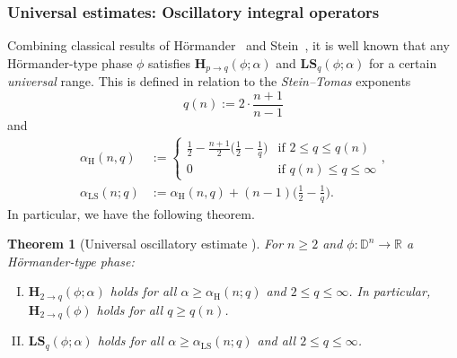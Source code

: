 \documentclass[reqno]{amsart}
\numberwithin{equation}{section}
\newcommand{\D}{\mathbb{D}}
\newcommand{\R}{\mathbb{R}}
\newcommand{\bH}{\mathbf{H}}
\newcommand{\bLS}{\mathbf{LS}}
\theoremstyle{plain}
\newtheorem{theorem}{Theorem}[section]
\theoremstyle{definition}
\begin{document}



\subsubsection*{Universal estimates: Oscillatory integral operators}%

Combining classical results of H\"ormander~\cite{Hormander1973} and Stein~\cite{Stein1986}, it is well known that any H\"ormander-type phase $\phi$ satisfies $\bH_{p \to q}(\phi;\alpha)$ and $\bLS_q(\phi; \alpha)$ for a certain \textit{universal} range. This is defined in relation to the \textit{Stein--Tomas} exponents
\begin{equation*}
  q(n) :=   2 \cdot \frac{n+1}{n-1}
\end{equation*}
and
\begin{align}\label{eq: H alpha def}
   \alpha_{\mathrm{H}}(n, q) &:=
   \begin{cases}
       \frac{1}{2} -\frac{n+1}{2}\Big(\frac{1}{2} - \frac{1}{q}\Big) & \textrm{if $2 \leq q \leq q(n)$} \\
       0 & \textrm{if $q(n) \leq q \leq \infty$}
   \end{cases}, \\
\label{eq: LS alpha def}
 \alpha_{\mathrm{LS}}(n;q) &:= \alpha_{\mathrm{H}}(n,q) + (n-1)\Big(\frac{1}{2} - \frac{1}{q}\Big).
\end{align}
In particular, we have the following theorem. 


\begin{theorem}[Universal oscillatory estimate \cite{Stein1986}]\label{thm: uni osc} For $n \geq 2$ and $\phi \colon \D^n \to \R$ a H\"ormander-type phase:
\begin{enumerate}[I)]
    \item $\bH_{2 \to q}(\phi; \alpha)$ holds for all $\alpha \geq \alpha_{\mathrm{H}}(n;q)$ and $2 \leq q \leq \infty$. In particular, $\bH_{2 \to q}(\phi)$ holds for all $q \geq q(n)$.
    \item $\bLS_q(\phi; \alpha)$ holds for all $\alpha \geq \alpha_{\mathrm{LS}}(n;q)$ and all $2 \leq q \leq \infty$. 
\end{enumerate}
\end{theorem}
\end{document}
